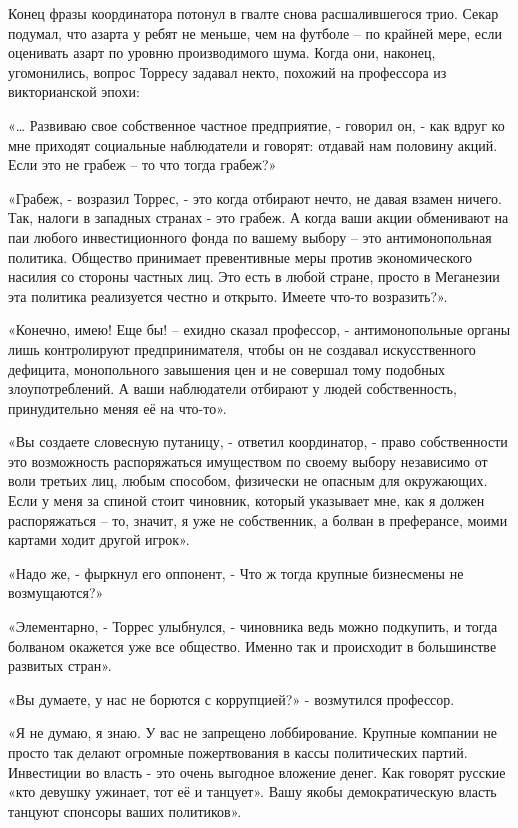\documentclass{book}
\begin{document}
Конец фразы координатора потонул в гвалте снова расшалившегося трио. Секар подумал, что азарта у ребят не меньше, чем на футболе -- по крайней мере, если оценивать азарт по уровню производимого шума. Когда они, наконец, угомонились, вопрос Торресу задавал некто, похожий на профессора из викторианской эпохи:

«\ldots{} Развиваю свое собственное частное предприятие, - говорил он, - как вдруг ко мне приходят социальные наблюдатели и говорят: отдавай нам половину акций. Если это не грабеж -- то что тогда грабеж?»

«Грабеж, - возразил Торрес, - это когда отбирают нечто, не давая взамен ничего. Так, налоги в западных странах - это грабеж. А когда ваши акции обменивают на паи любого инвестиционного фонда по вашему выбору -- это антимонопольная политика. Общество принимает превентивные меры против экономического насилия со стороны частных лиц. Это есть в любой стране, просто в Меганезии эта политика реализуется честно и открыто. Имеете что-то возразить?».

«Конечно, имею! Еще бы! -- ехидно сказал профессор, - антимонопольные органы лишь контролируют предпринимателя, чтобы он не создавал искусственного дефицита, монопольного завышения цен и не совершал тому подобных злоупотреблений. А ваши наблюдатели отбирают у людей собственность, принудительно меняя её на что-то».

«Вы создаете словесную путаницу, - ответил координатор, - право собственности это возможность распоряжаться имуществом по своему выбору независимо от воли третьих лиц, любым способом, физически не опасным для окружающих. Если у меня за спиной стоит чиновник, который указывает мне, как я должен распоряжаться -- то, значит, я уже не собственник, а болван в преферансе, моими картами ходит другой игрок».

«Надо же, - фыркнул его оппонент, - Что ж тогда крупные бизнесмены не возмущаются?»

«Элементарно, - Торрес улыбнулся, - чиновника ведь можно подкупить, и тогда болваном окажется уже все общество. Именно так и происходит в большинстве развитых стран».

«Вы думаете, у нас не борются с коррупцией?» - возмутился профессор.

«Я не думаю, я знаю. У вас не запрещено лоббирование. Крупные компании не просто так делают огромные пожертвования в кассы политических партий. Инвестиции во власть - это очень выгодное вложение денег. Как говорят русские «кто девушку ужинает, тот её и танцует». Вашу якобы демократическую власть танцуют спонсоры ваших политиков».
\end{document}
